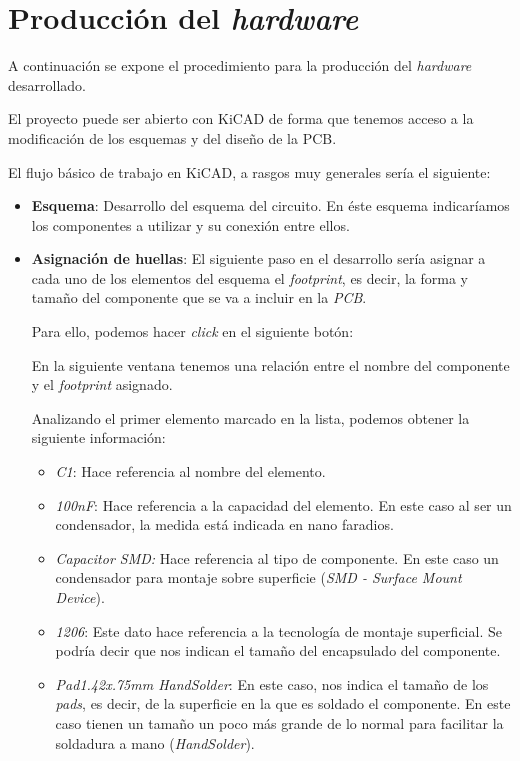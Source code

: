 \section{Producción del \emph{hardware}}

A continuación se expone el procedimiento para la producción del \emph{hardware} desarrollado.

El proyecto puede ser abierto con KiCAD de forma que tenemos acceso a la modificación de los esquemas y del diseño de la PCB.

El flujo básico de trabajo en KiCAD, a rasgos muy generales sería el siguiente:
\begin{itemize}
\item
\textbf{Esquema}: Desarrollo del esquema del circuito. En éste esquema indicaríamos los componentes a utilizar y su conexión entre ellos.

\item
\textbf{Asignación de huellas}: El siguiente paso en el desarrollo sería asignar a cada uno de los elementos del esquema el \emph{footprint}, es decir, la forma y tamaño del componente que se va a incluir en la \emph{PCB}.

Para ello, podemos hacer \emph{click} en el siguiente botón:


En la siguiente ventana tenemos una relación entre el nombre del componente y el \emph{footprint} asignado.


Analizando el primer elemento marcado en la lista, podemos obtener la siguiente información:

\begin{itemize}
\item
\textit{C1}: Hace referencia al nombre del elemento.
\item
\textit{100nF}: Hace referencia a la capacidad del elemento. En este caso al ser un condensador, la medida está indicada en nano faradios.
\item
\textit{Capacitor SMD:} Hace referencia al tipo de componente. En este caso un condensador para montaje sobre superficie (\emph{SMD - Surface Mount Device}).
\item
\textit{1206}: Este dato hace referencia a la tecnología de montaje superficial. Se podría decir que nos indican el tamaño del encapsulado del componente.
\item
\textit{Pad1.42x.75mm HandSolder}: En este caso, nos indica el tamaño de los \emph{pads}, es decir, de la superficie en la que es soldado el componente. En este caso tienen un tamaño un poco más grande de lo normal para facilitar la soldadura a mano (\emph{HandSolder}).
\end{itemize}


\end{itemize}
